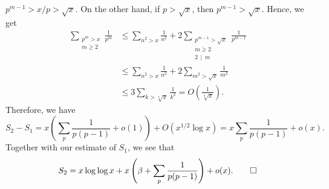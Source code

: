 \begin{pf}
    $p^{m-1} > x/p > \sqrt{x}$. On the other hand, if $p > \sqrt{x}$, then 
    $p^{m-1} > \sqrt{x}$. Hence, we get 
    \begin{align*} 
        \sum_{\substack{p^m > x \\ m \geq 2}} \frac{1}{p^m} 
        &\leq \sum_{n^2 > x} \frac{1}{n^2} + 2 \sum_{\substack{p^{m-1} > \sqrt{x}
        \\ m \geq 2 \\ 2\,\mid\,m}} \frac{1}{p^{m-1}} \\
        &\leq \sum_{n^2 > x} \frac{1}{n^2} + 2 \sum_{m^2 > \sqrt{x}} \frac{1}{m^2} \\ 
        &\leq 3 \sum_{k > \sqrt[4]{x}} \frac{1}{k^2} = O\left( \frac{1}{\sqrt[4]{x}} \right). 
    \end{align*}
    Therefore, we have 
    \[ S_2 - S_1 = x \left( \sum_p \frac{1}{p(p-1)} + o(1) \right) 
    + O(x^{1/2} \log x) = x \sum_p \frac{1}{p(p-1)} + o(x). \] 
    Together with our estimate of $S_1$, we see that 
    \[ S_2 = x\log\log x + x \left( \beta + \sum_p \frac{1}{p(p-1)} \right) 
    + o(x). \qedhere \] 
\end{pf}